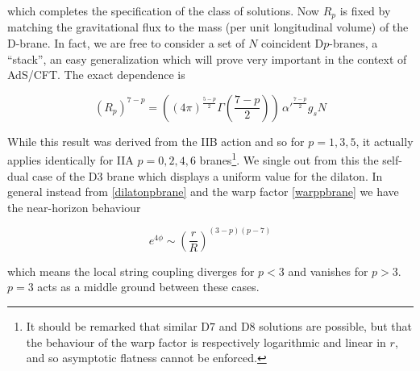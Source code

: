 which completes the specification of the class of solutions. Now $R_p$ is fixed by matching the gravitational flux to the mass (per unit longitudinal volume) of the D-brane. In fact, we are free to consider a set of $N$ coincident D$p$-branes, a ``stack'', an easy generalization which will prove very important in the context of AdS/CFT. The exact dependence is

\begin{equation}
	(R_p)^{7-p} =\left( (4\pi)^{\frac{5-p}{2}} \Gamma\left(\frac{7-p}{2}\right) \right) \, \alpha'^{\frac{7-p}{2}} g_s N
	\label{Rpbrane}
\end{equation}

While this result was derived from the IIB action and so for $p=1,3,5$, it actually applies identically for IIA $p=0,2,4,6$ branes\footnote{It should be remarked that similar D$7$ and D$8$ solutions are possible, but that the behaviour of the warp factor is respectively logarithmic and linear in $r$, and so asymptotic flatness cannot be enforced.}. We single out from this the self-dual case of the D$3$ brane which displays a uniform value for the dilaton. In general instead from \eqref{dilatonpbrane} and the warp factor \eqref{warppbrane} we have the near-horizon behaviour

\begin{equation}
	e^{4\phi} \sim \left( \frac{r}{R} \right)^{(3-p)(p-7)}
	\label{}
\end{equation}

which means the local string coupling diverges for $p<3$ and vanishes for $p>3$. $p=3$ acts as a middle ground between these cases.
